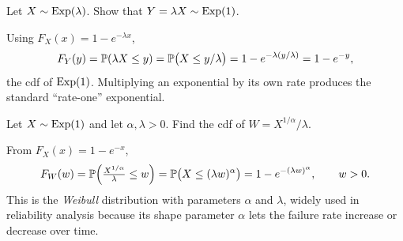 \begin{example}
Let $X\sim\mathrm{Exp}(\lambda)$. Show that $Y=\lambda X\sim\mathrm{Exp}(1)$.

\solution Using $F_X(x)=1-e^{-\lambda x}$,
\[
  F_Y(y)=\mathbb{P}(\lambda X\le y)=\mathbb{P}\bigl(X\le y/\lambda\bigr)=1-e^{-\lambda(y/\lambda)}=1-e^{-y},
\]
the cdf of $\mathrm{Exp}(1)$. Multiplying an exponential by its own rate produces the
standard ``rate-one'' exponential.
\end{example}

\begin{example}
Let $X\sim\mathrm{Exp}(1)$ and let $\alpha,\lambda>0$. Find the cdf of
$W=X^{1/\alpha}/\lambda$.

\solution From $F_X(x)=1-e^{-x}$,
\[
  F_W(w)=\mathbb{P}\Bigl(\tfrac{X^{1/\alpha}}{\lambda}\le w\Bigr)
   =\mathbb{P}\bigl(X\le(\lambda w)^\alpha\bigr)=1-e^{-(\lambda w)^\alpha},\qquad w>0.
\]
This is the \emph{Weibull} distribution with parameters $\alpha$ and $\lambda$,
widely used in reliability analysis because its shape parameter $\alpha$ lets the
failure rate increase or decrease over time.
\end{example}
